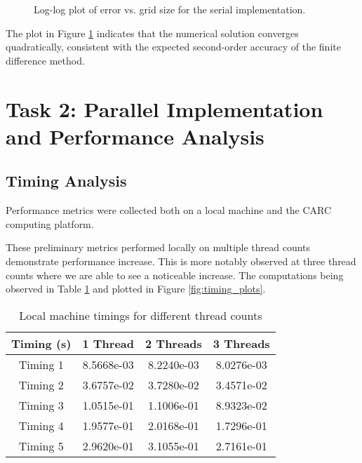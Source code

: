\documentclass[12pt]{article}
\begin{document}
\begin{figure}[h!]
\centering
\caption{Log-log plot of error vs. grid size for the serial implementation.}
\label{fig:error_serial}
\end{figure}
\FloatBarrier


The plot in Figure \ref{fig:error_serial} indicates that the numerical solution converges quadratically, consistent with the expected second-order accuracy of the finite difference method.



\FloatBarrier

\section{Task 2: Parallel Implementation and Performance Analysis}


\subsection{Timing Analysis}
Performance metrics were collected both on a local machine and the CARC computing platform.

These preliminary metrics performed locally on multiple thread counts demonstrate performance increase. This is more notably observed at three thread counts where we are able to see a noticeable increase.
The computations being observed in Table \ref{tab:local_timings} and plotted in Figure \ref{fig:timing_plots}.

\begin{table}[h!]
\centering
\begin{tabular}{|c|c|c|c|}
\hline
	Timing (s) & 	1 Thread & 	2 Threads & 	3 Threads \\ \hline
	Timing 1 & 8.5668e-03 & 8.2240e-03 & 8.0276e-03 \\ \hline
	Timing 2 & 3.6757e-02 & 3.7280e-02 & 3.4571e-02 \\ \hline
	Timing 3 & 1.0515e-01 & 1.1006e-01 & 8.9323e-02 \\ \hline
	Timing 4 & 1.9577e-01 & 2.0168e-01 & 1.7296e-01 \\ \hline
	Timing 5 & 2.9620e-01 & 3.1055e-01 & 2.7161e-01 \\ \hline
\end{tabular}
\caption{Local machine timings for different thread counts}
\label{tab:local_timings}
\end{table}
\end{document}
